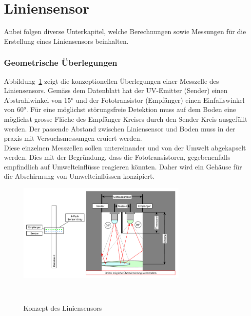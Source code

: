 \documentclass[main.tex]{subfiles} %
\begin{document}

\section{Liniensensor}
\label{anhang:Liniensensor}
Anbei folgen diverse Unterkapitel, welche Berechnungen sowie Messungen für die Erstellung eines Liniensensors beinhalten.

\subsubsection*{Geometrische Überlegungen}
Abbildung~\ref{fig:Konzept_graphml} zeigt die konzeptionellen Überlegungen einer Messzelle des
Liniensensors. Gemäss dem Datenblatt hat der UV-Emitter (Sender) einen Abstrahlwinkel von 15° und der
Fototransistor (Empfänger) einen Einfallswinkel von 60°. Für eine möglichst störungsfreie Detektion muss auf dem Boden 
eine möglichst grosse Fläche des Empfänger-Kreises durch den Sender-Kreis ausgefüllt werden. Der passende
Abstand zwischen Liniensensor und Boden muss in der praxis mit Versuchsmessungen eruiert werden.\\
Diese einzelnen Messzellen sollen untereinander und von der Umwelt abgekapselt werden. Dies
mit der Begründung, dass die Fototransistoren, gegebenenfalls empfindlich auf
Umwelteinflüsse reagieren könnten. Daher wird ein Gehäuse für die Abschirmung von Umwelteinflüssen
konzipiert.

\begin{figure}[H]
    \centering
    \includegraphics[width=0.75\textwidth]{./fig_Liniensensor/Konzept.pdf}
    \caption{Konzept des Liniensensors}~\label{fig:Konzept_graphml}
\end{figure}

\end{document}
